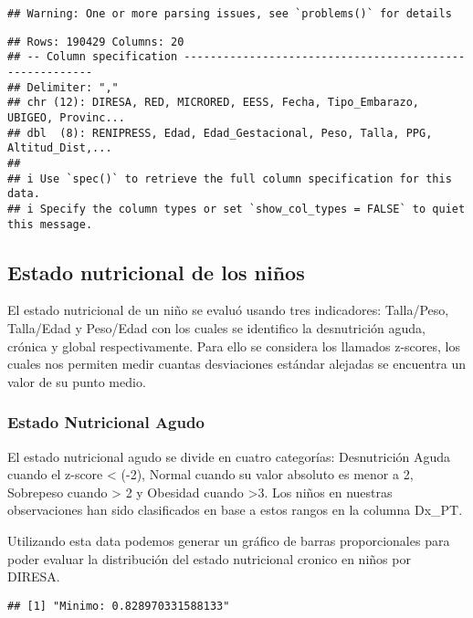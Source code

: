 \documentclass[
]{article}
\begin{document}
\begin{verbatim}
## Warning: One or more parsing issues, see `problems()` for details
\end{verbatim}

\begin{verbatim}
## Rows: 190429 Columns: 20
## -- Column specification --------------------------------------------------------
## Delimiter: ","
## chr (12): DIRESA, RED, MICRORED, EESS, Fecha, Tipo_Embarazo, UBIGEO, Provinc...
## dbl  (8): RENIPRESS, Edad, Edad_Gestacional, Peso, Talla, PPG, Altitud_Dist,...
## 
## i Use `spec()` to retrieve the full column specification for this data.
## i Specify the column types or set `show_col_types = FALSE` to quiet this message.
\end{verbatim}

\hypertarget{estado-nutricional-de-los-niuxf1os}{%
\subsection{Estado nutricional de los
niños}\label{estado-nutricional-de-los-niuxf1os}}

El estado nutricional de un niño se evaluó usando tres indicadores:
Talla/Peso, Talla/Edad y Peso/Edad con los cuales se identifico la
desnutrición aguda, crónica y global respectivamente. Para ello se
considera los llamados z-scores, los cuales nos permiten medir cuantas
desviaciones estándar alejadas se encuentra un valor de su punto medio.

\hypertarget{estado-nutricional-agudo}{%
\subsubsection{Estado Nutricional
Agudo}\label{estado-nutricional-agudo}}

El estado nutricional agudo se divide en cuatro categorías: Desnutrición
Aguda cuando el z-score \textless{} (-2), Normal cuando su valor
absoluto es menor a 2, Sobrepeso cuando \textgreater{} 2 y Obesidad
cuando \textgreater3. Los niños en nuestras observaciones han sido
clasificados en base a estos rangos en la columna Dx\_PT.

Utilizando esta data podemos generar un gráfico de barras proporcionales
para poder evaluar la distribución del estado nutricional cronico en
niños por DIRESA.

\begin{verbatim}
## [1] "Minimo: 0.828970331588133"
\end{verbatim}
\end{document}
